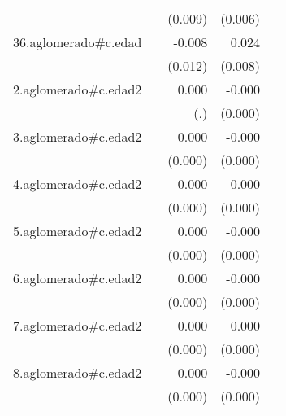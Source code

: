 {\begin{longtable}{l*{4}{D{.}{.}{-1}}}
            &                     &     (0.009)         &     (0.006)         &                     \\
\addlinespace
36.aglomerado#c.edad&                     &      -0.008         &       0.024\sym{**} &                     \\
            &                     &     (0.012)         &     (0.008)         &                     \\
\addlinespace
2.aglomerado#c.edad2&                     &       0.000         &      -0.000\sym{***}&                     \\
            &                     &         (.)         &     (0.000)         &                     \\
\addlinespace
3.aglomerado#c.edad2&                     &       0.000         &      -0.000         &                     \\
            &                     &     (0.000)         &     (0.000)         &                     \\
\addlinespace
4.aglomerado#c.edad2&                     &       0.000\sym{*}  &      -0.000         &                     \\
            &                     &     (0.000)         &     (0.000)         &                     \\
\addlinespace
5.aglomerado#c.edad2&                     &       0.000         &      -0.000         &                     \\
            &                     &     (0.000)         &     (0.000)         &                     \\
\addlinespace
6.aglomerado#c.edad2&                     &       0.000         &      -0.000         &                     \\
            &                     &     (0.000)         &     (0.000)         &                     \\
\addlinespace
7.aglomerado#c.edad2&                     &       0.000         &       0.000         &                     \\
            &                     &     (0.000)         &     (0.000)         &                     \\
\addlinespace
8.aglomerado#c.edad2&                     &       0.000         &      -0.000         &                     \\
            &                     &     (0.000)         &     (0.000)         &                     \\

\end{longtable}}
